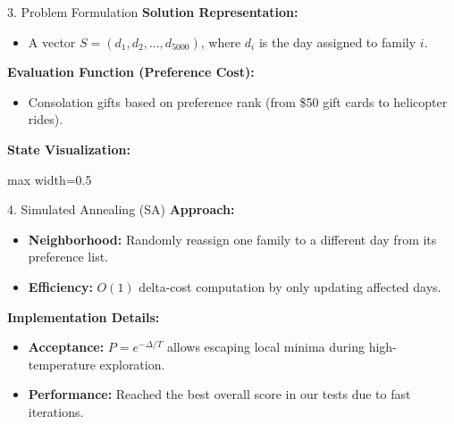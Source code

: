 \documentclass[aspectratio=169]{beamer}
\begin{document}
\begin{frame}{3. Problem Formulation}
\textbf{Solution Representation:}
\begin{itemize}
    \item A vector $S = (d_1, d_2, ..., d_{5000})$, where $d_i$ is the day assigned to family $i$.
\end{itemize}

\textbf{Evaluation Function (Preference Cost):}
\begin{itemize}
    \item Consolation gifts based on preference rank (from \$50 gift cards to helicopter rides).
\end{itemize}

\textbf{State Visualization:}
\begin{center}
\begin{adjustbox}{max width=0.5\textwidth}
\end{adjustbox}
\end{center}
\end{frame}

\begin{frame}{4. Simulated Annealing (SA)}
\textbf{Approach:}
\begin{itemize}
    \item \textbf{Neighborhood:} Randomly reassign one family to a different day from its preference list.
    \item \textbf{Efficiency:} $O(1)$ delta-cost computation by only updating affected days.
\end{itemize}

\textbf{Implementation Details:}
\begin{itemize}
    \item \textbf{Acceptance:} $P = e^{-\Delta / T}$ allows escaping local minima during high-temperature exploration.
    \item \textbf{Performance:} Reached the best overall score in our tests due to fast iterations.
\end{itemize}
\end{frame}
\end{document}
